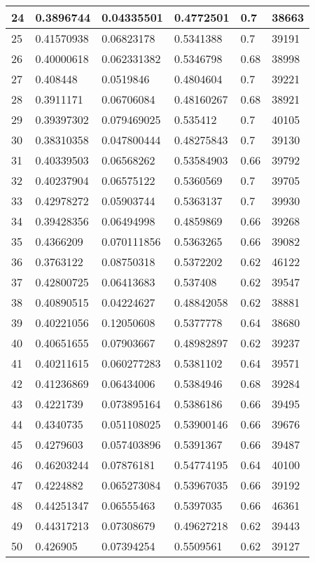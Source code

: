 \begin{longtable}{|l|l|l|l|l|l|}
24 & 0.3896744 & 0.04335501 & 0.4772501 & 0.7 & 38663 \\ \hline 
25 & 0.41570938 & 0.06823178 & 0.5341388 & 0.7 & 39191 \\ \hline 
26 & 0.40000618 & 0.062331382 & 0.5346798 & 0.68 & 38998 \\ \hline 
27 & 0.408448 & 0.0519846 & 0.4804604 & 0.7 & 39221 \\ \hline 
28 & 0.3911171 & 0.06706084 & 0.48160267 & 0.68 & 38921 \\ \hline 
29 & 0.39397302 & 0.079469025 & 0.535412 & 0.7 & 40105 \\ \hline 
30 & 0.38310358 & 0.047800444 & 0.48275843 & 0.7 & 39130 \\ \hline 
31 & 0.40339503 & 0.06568262 & 0.53584903 & 0.66 & 39792 \\ \hline 
32 & 0.40237904 & 0.06575122 & 0.5360569 & 0.7 & 39705 \\ \hline 
33 & 0.42978272 & 0.05903744 & 0.5363137 & 0.7 & 39930 \\ \hline 
34 & 0.39428356 & 0.06494998 & 0.4859869 & 0.66 & 39268 \\ \hline 
35 & 0.4366209 & 0.070111856 & 0.5363265 & 0.66 & 39082 \\ \hline 
36 & 0.3763122 & 0.08750318 & 0.5372202 & 0.62 & 46122 \\ \hline 
37 & 0.42800725 & 0.06413683 & 0.537408 & 0.62 & 39547 \\ \hline 
38 & 0.40890515 & 0.04224627 & 0.48842058 & 0.62 & 38881 \\ \hline 
39 & 0.40221056 & 0.12050608 & 0.5377778 & 0.64 & 38680 \\ \hline 
40 & 0.40651655 & 0.07903667 & 0.48982897 & 0.62 & 39237 \\ \hline 
41 & 0.40211615 & 0.060277283 & 0.5381102 & 0.64 & 39571 \\ \hline 
42 & 0.41236869 & 0.06434006 & 0.5384946 & 0.68 & 39284 \\ \hline 
43 & 0.4221739 & 0.073895164 & 0.5386186 & 0.66 & 39495 \\ \hline 
44 & 0.4340735 & 0.051108025 & 0.53900146 & 0.66 & 39676 \\ \hline 
45 & 0.4279603 & 0.057403896 & 0.5391367 & 0.66 & 39487 \\ \hline 
46 & 0.46203244 & 0.07876181 & 0.54774195 & 0.64 & 40100 \\ \hline 
47 & 0.4224882 & 0.065273084 & 0.53967035 & 0.66 & 39192 \\ \hline 
48 & 0.44251347 & 0.06555463 & 0.5397035 & 0.66 & 46361 \\ \hline 
49 & 0.44317213 & 0.07308679 & 0.49627218 & 0.62 & 39443 \\ \hline 
50 & 0.426905 & 0.07394254 & 0.5509561 & 0.62 & 39127 \\ \hline 
\end{longtable}